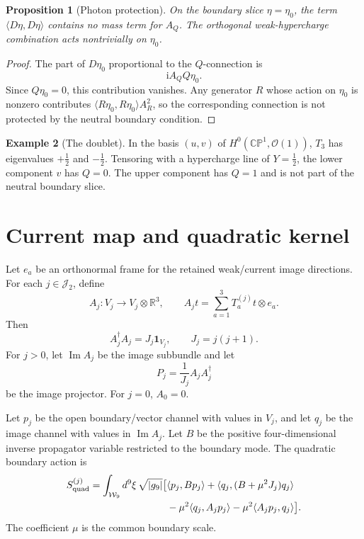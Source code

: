 \documentclass[11pt]{article}
\newcommand{\CP}{\mathbb{CP}}
\newcommand{\RR}{\mathbb{R}}
\newcommand{\JJ}{\mathcal{J}}
\newcommand{\WW}{\mathcal{W}}
\newcommand{\OO}{\mathcal{O}}
\newcommand{\ii}{\mathrm{i}}
\newcommand{\Imop}{\operatorname{Im}}
\theoremstyle{plain}
\newtheorem{proposition}{Proposition}[section]
\theoremstyle{definition}
\newtheorem{example}[proposition]{Example}
\begin{document}
\begin{proposition}[Photon protection]
\label{bd:prop:q-protection}
On the boundary slice \(\eta=\eta_0\), the term \(\langle D\eta,D\eta\rangle\)
contains no mass term for \(A_Q\).  The orthogonal weak-hypercharge
combination acts nontrivially on \(\eta_0\).
\end{proposition}

\begin{proof}
The part of \(D\eta_0\) proportional to the \(Q\)-connection is
\[
  \ii A_QQ\eta_0 .
\]
Since \(Q\eta_0=0\), this contribution vanishes.  Any generator \(R\) whose
action on \(\eta_0\) is nonzero contributes
\(\langle R\eta_0,R\eta_0\rangle A_R^2\), so the corresponding connection is
not protected by the neutral boundary condition.
\end{proof}

\begin{example}[The doublet]
\label{bd:ex:doublet}
In the basis \((u,v)\) of \(H^0(\CP^1,\OO(1))\), \(T_3\) has eigenvalues
\(+\tfrac12\) and \(-\tfrac12\).  Tensoring with a hypercharge line of
\(Y=\tfrac12\), the lower component \(v\) has \(Q=0\).  The upper component has
\(Q=1\) and is not part of the neutral boundary slice.
\end{example}

\section{Current map and quadratic kernel}
\label{bd:sec:quadratic-kernel}

Let \(e_a\) be an orthonormal frame for the retained weak/current image
directions.  For each \(j\in\JJ_2\), define
\begin{equation}
  A_j:V_j\longrightarrow V_j\otimes\RR^3,\qquad
  A_jt=\sum_{a=1}^3T_a^{(j)}t\otimes e_a .
  \label{bd:eq:aj}
\end{equation}
Then
\begin{equation}
  A_j^\dagger A_j=J_j\mathbf 1_{V_j},\qquad J_j=j(j+1).
  \label{bd:eq:aj-norm}
\end{equation}
For \(j>0\), let \(\Imop A_j\) be the image subbundle and let
\[
  P_j=\frac{1}{J_j}A_jA_j^\dagger
  \label{bd:eq:pj}
\]
be the image projector.  For \(j=0\), \(A_0=0\).

Let \(p_j\) be the open boundary/vector channel with values in \(V_j\), and let
\(q_j\) be the image channel with values in \(\Imop A_j\).  Let \(B\) be the
positive four-dimensional inverse propagator variable restricted to the
boundary mode.  The quadratic boundary action is
\begin{equation}
\begin{split}
  S_{\rm quad}^{(j)}
  =
  \int_{\WW_9}d^9\xi\,\sqrt{|g_9|}
  \big[
  &\langle p_j,Bp_j\rangle
  +\langle q_j,(B+\mu^2J_j)q_j\rangle \\
  &-\mu^2\langle q_j,A_jp_j\rangle
  -\mu^2\langle A_jp_j,q_j\rangle
  \big].
  \label{bd:eq:squad}
\end{split}
\end{equation}
The coefficient \(\mu\) is the common boundary scale.
\end{document}
